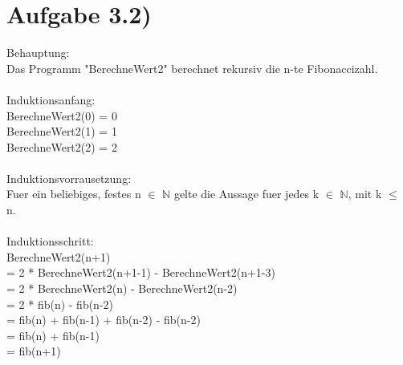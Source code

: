 \documentclass{article}
\begin{document}
\section*{Aufgabe 3.2)}
Behauptung:\\
Das Programm "BerechneWert2" berechnet rekursiv die n-te Fibonaccizahl.\\
\\
Induktionsanfang:\\
BerechneWert2(0) = 0\\
BerechneWert2(1) = 1\\
BerechneWert2(2) = 2\\
\\
Induktionsvorrausetzung:\\
Fuer ein beliebiges, festes n $\in$ $\mathbb{N}$ gelte die Aussage fuer jedes k $\in$ $\mathbb{N}$, mit k $\le$ n.\\
\\
Induktionsschritt:\\
BerechneWert2(n+1) \\
= 2 * BerechneWert2(n+1-1) - BerechneWert2(n+1-3)\\
= 2 * BerechneWert2(n) - BerechneWert2(n-2)\\
= 2 * fib(n) - fib(n-2)\\
= fib(n) + fib(n-1) + fib(n-2) - fib(n-2)\\
= fib(n) + fib(n-1)\\
= fib(n+1)\\ 
\end{document}
